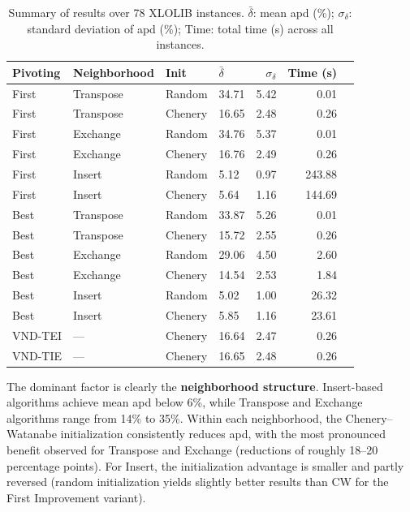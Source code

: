 \documentclass[11pt,a4paper]{article}
\begin{document}
\begin{table}[H]
\centering
\caption{Summary of results over 78 XLOLIB instances.
$\bar{\delta}$: mean apd (\%); $\sigma_\delta$: standard deviation of
apd (\%); Time: total time (s) across all instances.}
\label{tab:summary}
\setlength{\tabcolsep}{7pt}
\begin{tabular}{llll r r r}
\toprule
\textbf{Pivoting} & \textbf{Neighborhood} & \textbf{Init}
  & $\bar{\delta}$ & $\sigma_\delta$ & \textbf{Time (s)} \\
\midrule
First  & Transpose & Random  & 34.71 & 5.42  & 0.01 \\
First  & Transpose & Chenery & 16.65 & 2.48  & 0.26 \\
First  & Exchange  & Random  & 34.76 & 5.37  & 0.01 \\
First  & Exchange  & Chenery & 16.76 & 2.49  & 0.26 \\
First  & Insert    & Random  &  5.12 & 0.97  & 243.88 \\
First  & Insert    & Chenery &  5.64 & 1.16  & 144.69 \\
\midrule
Best   & Transpose & Random  & 33.87 & 5.26  & 0.01 \\
Best   & Transpose & Chenery & 15.72 & 2.55  & 0.26 \\
Best   & Exchange  & Random  & 29.06 & 4.50  & 2.60 \\
Best   & Exchange  & Chenery & 14.54 & 2.53  & 1.84 \\
Best   & Insert    & Random  &  5.02 & 1.00  & 26.32 \\
Best   & Insert    & Chenery &  5.85 & 1.16  & 23.61 \\
\midrule
VND-TEI & ---      & Chenery & 16.64 & 2.47  & 0.26 \\
VND-TIE & ---      & Chenery & 16.65 & 2.48  & 0.26 \\
\bottomrule
\end{tabular}
\end{table}

The dominant factor is clearly the \textbf{neighborhood structure}.
Insert-based algorithms achieve mean apd below 6\%, while Transpose and
Exchange algorithms range from 14\% to 35\%.  Within each neighborhood,
the Chenery--Watanabe initialization consistently reduces apd, with the
most pronounced benefit observed for Transpose and Exchange (reductions
of roughly 18--20 percentage points).  For Insert, the initialization
advantage is smaller and partly reversed (random initialization yields
slightly better results than CW for the First Improvement variant).
\end{document}
